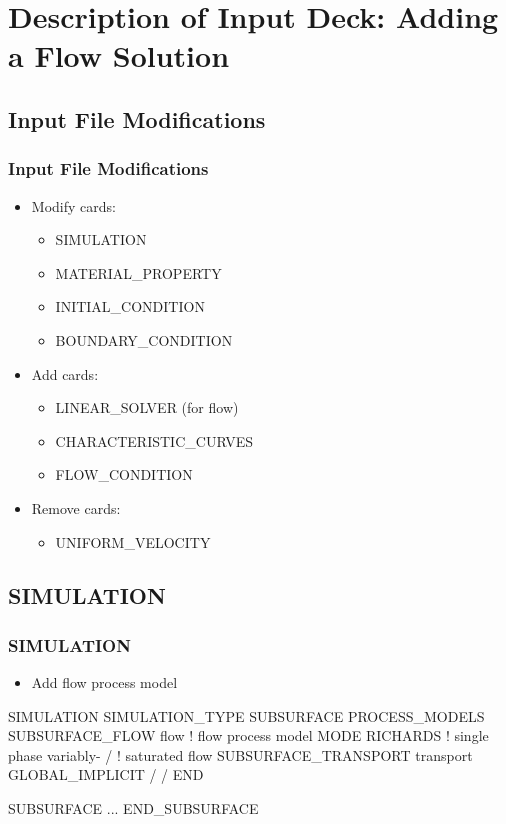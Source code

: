 \documentclass{beamer}
\newcommand\bluecomment[1]{{{\color{blue} #1}}}
\begin{document}
\section{Description of Input Deck: Adding a Flow Solution}

\subsection{Input File Modifications}

\begin{frame}[fragile]\frametitle{Input File Modifications}

\begin{itemize}
\item Modify cards:
  \begin{itemize}
    \item SIMULATION
    \item MATERIAL\_PROPERTY
    \item INITIAL\_CONDITION
    \item BOUNDARY\_CONDITION
   \end{itemize}
\item Add cards:
  \begin{itemize}
    \item LINEAR\_SOLVER (for flow)
    \item CHARACTERISTIC\_CURVES
    \item FLOW\_CONDITION
  \end{itemize}
\item Remove cards:
  \begin{itemize}
    \item UNIFORM\_VELOCITY
  \end{itemize}
\end{itemize}

\end{frame}

\subsection{SIMULATION}

\begin{frame}[fragile]\frametitle{SIMULATION}

\begin{itemize}
  \item Add flow process model
\end{itemize}


\begin{semiverbatim}
SIMULATION
  SIMULATION_TYPE SUBSURFACE
  PROCESS_MODELS
    SUBSURFACE_FLOW flow  \bluecomment{! flow process model}
      MODE RICHARDS       \bluecomment{! single phase variably-}
    /                     \bluecomment{!   saturated flow}
    SUBSURFACE_TRANSPORT transport
      GLOBAL_IMPLICIT
    /
  /
END

SUBSURFACE
  ...
END_SUBSURFACE
\end{semiverbatim}

\end{frame}
\end{document}
